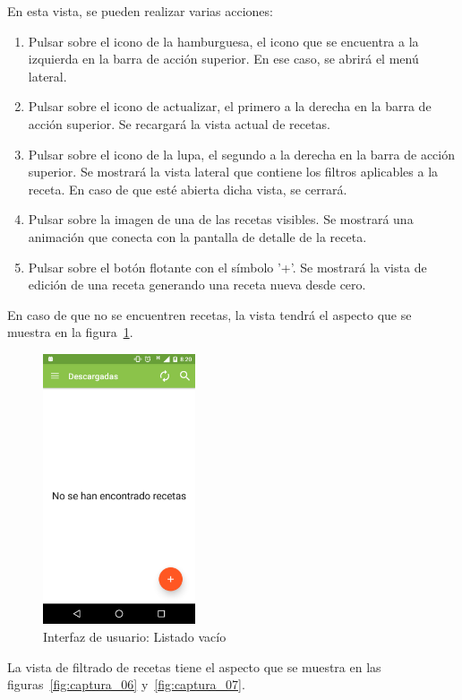 En esta vista, se pueden realizar varias acciones:
\begin{enumerate}
\item Pulsar sobre el icono de la hamburguesa, el icono que se encuentra a la
  izquierda en la barra de acción superior. En ese caso, se abrirá el menú
  lateral.
\item Pulsar sobre el icono de actualizar, el primero a la derecha en la barra
  de acción superior. Se recargará la vista actual de recetas.
\item Pulsar sobre el icono de la lupa, el segundo a la derecha en la barra
  de acción superior. Se mostrará la vista lateral que contiene los filtros
  aplicables a la receta. En caso de que esté abierta dicha vista, se cerrará.
\item Pulsar sobre la imagen de una de las recetas visibles. Se mostrará una
  animación que conecta con la pantalla de detalle de la receta.
\item Pulsar sobre el botón flotante con el símbolo '+'. Se mostrará la vista
  de edición de una receta generando una receta nueva desde cero.
\end{enumerate}

En caso de que no se encuentren recetas, la vista tendrá el aspecto que se
muestra en la figura~\ref{fig:captura_04}.

\begin{figure}[htbp]
  \centering
  \includegraphics[width=0.4\textwidth]{cap5/img/captura_04}
  \caption{Interfaz de usuario: Listado vacío}
  \label{fig:captura_04}
\end{figure}

La vista de filtrado de recetas tiene el aspecto que se muestra en las
figuras~\ref{fig:captura_06} y~\ref{fig:captura_07}.

